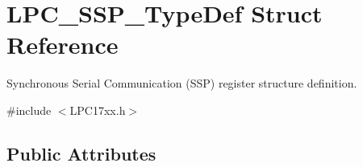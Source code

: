 \hypertarget{struct_l_p_c___s_s_p___type_def}{\section{\-L\-P\-C\-\_\-\-S\-S\-P\-\_\-\-Type\-Def \-Struct \-Reference}
\label{struct_l_p_c___s_s_p___type_def}
}


\-Synchronous \-Serial \-Communication (\-S\-S\-P) register structure definition.  




{\ttfamily \#include $<$\-L\-P\-C17xx.\-h$>$}

\subsection*{\-Public \-Attributes}
